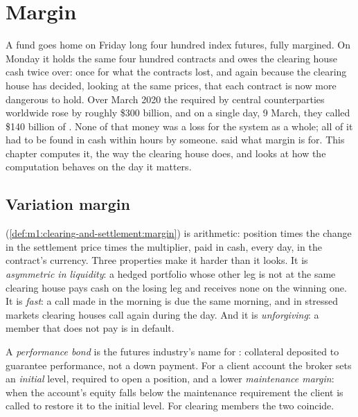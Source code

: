 \chapter{Margin}\label{ch:m1:margin}

A fund goes home on Friday long four hundred index futures, fully margined.
On Monday it holds the same four hundred contracts and owes the clearing
house cash twice over: once for what the contracts lost, and again because
the clearing house has decided, looking at the same prices, that each
contract is now more dangerous to hold. Over March 2020 the 
required by central counterparties worldwide rose by roughly \$300 billion,
and on a single day, 9 March, they called \$140 billion of .
None of that money was a loss for the system as a whole; all of it had to be
found in cash within hours by someone. 
said what margin is for. This chapter computes it, the way the clearing
house does, and looks at how the computation behaves on the day it matters.

\section{Variation margin}

 (\cref{def:m1:clearing-and-settlement:margin}) is
arithmetic: position times the change in the settlement price times the
multiplier, paid in cash, every day, in the contract's currency. Three
properties make it harder than it looks. It is \emph{asymmetric in
liquidity}: a hedged portfolio whose other leg is not at the same clearing
house pays cash on the losing leg and receives none on the winning one. It is
\emph{fast}: a call made in the morning is due the same morning, and in
stressed markets clearing houses call again during the day. And it is
\emph{unforgiving}: a member that does not pay is in default.

\begin{definition}\label{def:m1:margin:bond}
A \emph{performance bond} is the futures industry's
name for : collateral deposited to guarantee performance, not a
down payment. For a client account the broker sets an \emph{initial} level,
required to open a position, and a lower \emph{maintenance
margin}: when the account's equity falls below the
maintenance requirement the client is called to restore it to the initial
level. For clearing members the two coincide.
\end{definition}

